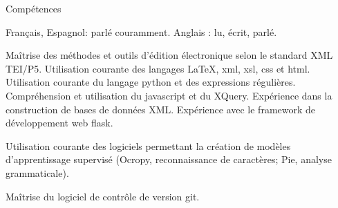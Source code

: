 











\begin{rubric}{Compétences}
                    \entry*
                    
                Français, Espagnol: parlé couramment. Anglais : lu,
                    écrit, parlé.
                    \entry*
                    
                Maîtrise des méthodes et outils d'édition électronique
                    selon le standard XML TEI/P5. Utilisation courante des
                    langages \LaTeX, xml, xsl, css et html. Utilisation courante
                    du langage python et des expressions régulières.
                    Compréhension et utilisation du javascript et du XQuery.
                    Expérience dans la construction de bases de données XML.
                    Expérience avec le framework de développement web
                    flask.
                    \entry*
                    
                Utilisation courante des logiciels permettant la
                    création de modèles d'apprentissage supervisé (Ocropy,
                    reconnaissance de caractères; Pie, analyse
                    grammaticale).
                    \entry*
                    
                Maîtrise du logiciel de contrôle de version
                    git.\end{rubric}



